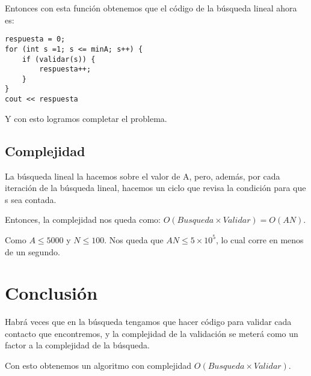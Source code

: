 Entonces con esta función obtenemos que el código de la búsqueda lineal ahora es:
\begin{lstlisting}
respuesta = 0;
for (int s =1; s <= minA; s++) {
	if (validar(s)) {
		respuesta++;
	}
}
cout << respuesta

\end{lstlisting}

Y con esto logramos completar el problema.

\subsection*{Complejidad}
La búsqueda lineal la hacemos sobre el valor de A, pero, además, por cada iteración de la búsqueda lineal, hacemos un ciclo que revisa la condición para que s sea contada.

Entonces, la complejidad nos queda como:   \(O(Busqueda\times Validar)=O(AN)\).

Como \(A\leq 5000\) y \(N\leq 100\). Nos queda que \(AN\leq 5\times 10^5\), lo cual corre en menos de un segundo.

\section*{Conclusión}
Habrá veces que en la búsqueda tengamos que hacer código para validar cada contacto que encontremos, y la complejidad de la validación se meterá como un factor a la complejidad de la búsqueda.  

Con esto obtenemos un algoritmo con complejidad \(O(Busqueda\times Validar)\).
\newpage

\practiceproblemregion

\problemtitle 

\problembreak

\problemtitle 

\problembreak

\problemtitle 
